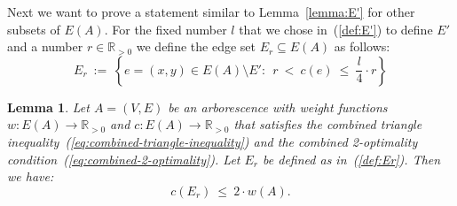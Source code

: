 \documentclass[a4paper, 11pt]{article}
\newtheorem{lemma}[theorem]{Lemma}
\begin{document}
Next we want to prove a statement similar to Lemma~\ref{lemma:E'} for other subsets of $E(A)$. 
For the fixed number $l$ that we chose in~(\ref{def:E'}) to define $E'$ and a number $r\in \mathbb{R}_{> 0}$ 
we define the edge set $E_r \subseteq E(A)$ as follows:
\begin{equation}
E_r ~:=~ \left\{ e=(x,y)\in E(A)\setminus E':~~ r ~<~ c(e) ~\le~ \frac{l}{4} \cdot r \right\}
\label{def:Er}
\end{equation}



\begin{lemma}\label{lemma:arborescence}
Let $A=(V,E)$ be an arborescence with weight functions $w:E(A)\to \mathbb{R}_{> 0}$ and $c:E(A)\to \mathbb{R}_{> 0}$
that satisfies the combined triangle inequality~(\ref{eq:combined-triangle-inequality})
and the combined 2-optimality condition~(\ref{eq:combined-2-optimality}).
Let $E_r$ be defined as in~(\ref{def:Er}).
Then we have: \[c(E_r) ~\le~ 2\cdot w(A) .\]  
\end{lemma}
\end{document}
